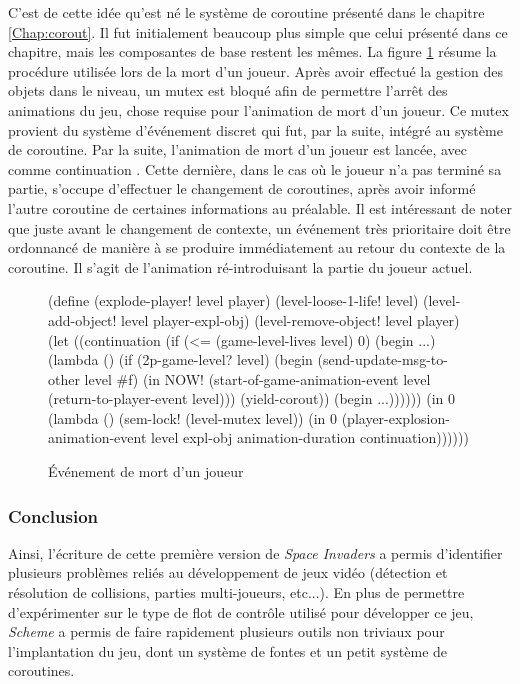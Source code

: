 \documentclass[12pt,twoside,letterpaper,francais]{book}
\newcommand{\si}{{\textit{Space Invaders }}}
\newcommand{\Schemelang}{{\textit{Scheme }}}
\newcommand{\scheme}[1]{\selectlanguage{english}{\tt #1}\selectlanguage{french}}
\begin{document}
C'est de cette idée qu'est né le système de coroutine présenté dans le
chapitre \ref{Chap:corout}. Il fut initialement beaucoup plus simple
que celui présenté dans ce chapitre, mais les composantes de base
restent les mêmes. La figure \ref{Exp:si-mort} résume la procédure
utilisée lors de la mort d'un joueur. Après avoir effectué la gestion
des objets dans le niveau, un mutex est bloqué afin de permettre
l'arrêt des animations du jeu, chose requise pour l'animation de mort
d'un joueur. Ce mutex provient du système d'événement discret qui fut,
par la suite, intégré au système de coroutine. Par la suite,
l'animation de mort d'un joueur est lancée, avec comme continuation
\scheme{continuation}. Cette dernière, dans le cas où le joueur n'a
pas terminé sa partie, s'occupe d'effectuer le changement de
coroutines, après avoir informé l'autre coroutine de certaines
informations au préalable. Il est intéressant de noter que juste avant
le changement de contexte, un événement très prioritaire doit être
ordonnancé de manière à se produire immédiatement au retour du
contexte de la coroutine. Il s'agit de l'animation ré-introduisant la
partie du joueur actuel.\\

\begin{figure}[htb!]
  \begin{schemecode}
(define (explode-player! level player)
  (level-loose-1-life! level)
  (level-add-object! level player-expl-obj)
  (level-remove-object! level player)
  (let ((continuation
         (if (<= (game-level-lives level) 0)
             (begin ...)
             (lambda ()
               (if (2p-game-level? level)
                   (begin
                     (send-update-msg-to-other level \#f)
                     (in NOW! (start-of-game-animation-event
                               level (return-to-player-event level)))
                     (yield-corout))
                   (begin ...))))))
     (in 0 (lambda ()
            (sem-lock! (level-mutex level))
            (in 0 (player-explosion-animation-event
                   level expl-obj animation-duration continuation))))))
   \end{schemecode}
  \caption{Événement de mort d'un joueur}
  \label{Exp:si-mort}
\end{figure}


\FloatBarrier
\subsubsection{Conclusion}
Ainsi, l'écriture de cette première version de \si a permis
d'identifier plusieurs problèmes reliés au développement de jeux vidéo
(détection et résolution de collisions, parties multi-joueurs,
etc...). En plus de permettre d'expérimenter sur le type de flot de
contrôle utilisé pour développer ce jeu, \Schemelang a permis de faire
rapidement plusieurs outils non triviaux pour l'implantation du jeu,
dont un système de fontes et un petit système de coroutines.
\end{document}
